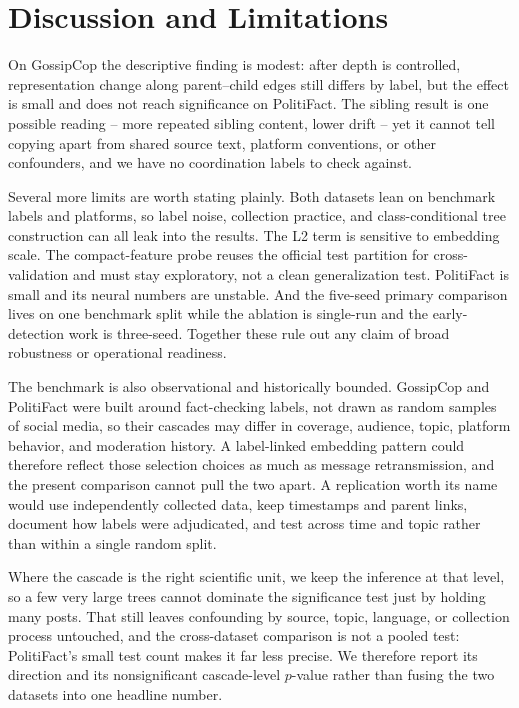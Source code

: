 \documentclass[conference]{IEEEtran}
\begin{document}
\section{Discussion and Limitations}
On GossipCop the descriptive finding is modest: after depth is controlled,
representation change along parent--child edges still differs by label, but the
effect is small and does not reach significance on PolitiFact. The sibling
result is one possible reading -- more repeated sibling content, lower drift --
yet it cannot tell copying apart from shared source text, platform conventions,
or other confounders, and we have no coordination labels to check against.

Several more limits are worth stating plainly. Both datasets lean on benchmark
labels and platforms, so label noise, collection practice, and
class-conditional tree construction can all leak into the results. The L2 term
is sensitive to embedding scale. The compact-feature probe reuses the official
test partition for cross-validation and must stay exploratory, not a clean
generalization test. PolitiFact is small and its neural numbers are unstable.
And the five-seed primary comparison lives on one benchmark split while the
ablation is single-run and the early-detection work is three-seed. Together
these rule out any claim of broad robustness or operational readiness.

The benchmark is also observational and historically bounded. GossipCop and
PolitiFact were built around fact-checking labels, not drawn as random samples
of social media, so their cascades may differ in coverage, audience, topic,
platform behavior, and moderation history. A label-linked embedding pattern
could therefore reflect those selection choices as much as message
retransmission, and the present comparison cannot pull the two apart. A
replication worth its name would use independently collected data, keep
timestamps and parent links, document how labels were adjudicated, and test
across time and topic rather than within a single random split.

Where the cascade is the right scientific unit, we keep the inference at that
level, so a few very large trees cannot dominate the significance test just by
holding many posts. That still leaves confounding by source, topic, language,
or collection process untouched, and the cross-dataset comparison is not a
pooled test: PolitiFact's small test count makes it far less precise. We
therefore report its direction and its nonsignificant cascade-level $p$-value
rather than fusing the two datasets into one headline number.
\end{document}
